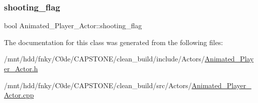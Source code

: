 \subsubsection{\texorpdfstring{shooting\+\_\+flag}{shooting\_flag}}
{\footnotesize\ttfamily bool Animated\+\_\+\+Player\+\_\+\+Actor\+::shooting\+\_\+flag\hspace{0.3cm}{\ttfamily [private]}}



The documentation for this class was generated from the following files\+:\begin{DoxyCompactItemize}
\item 
/mnt/hdd/fnky/\+C0de/\+C\+A\+P\+S\+T\+O\+N\+E/clean\+\_\+build/include/\+Actors/\hyperlink{Animated__Player__Actor_8h}{Animated\+\_\+\+Player\+\_\+\+Actor.\+h}\item 
/mnt/hdd/fnky/\+C0de/\+C\+A\+P\+S\+T\+O\+N\+E/clean\+\_\+build/src/\+Actors/\hyperlink{Animated__Player__Actor_8cpp}{Animated\+\_\+\+Player\+\_\+\+Actor.\+cpp}\end{DoxyCompactItemize}

